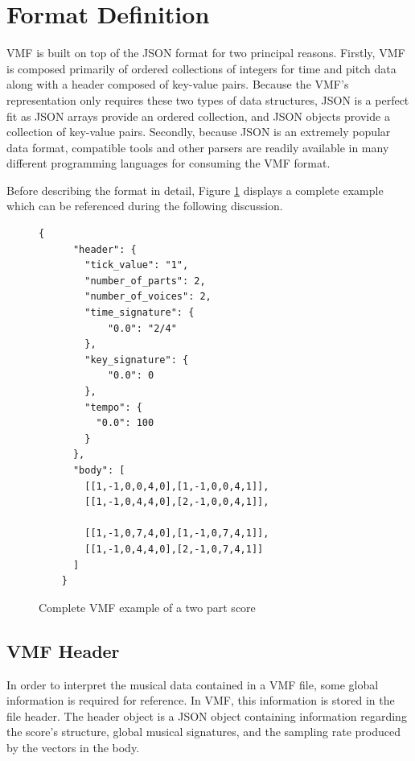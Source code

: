 
\section{Format Definition}

VMF is built on top of the JSON format for two principal reasons. Firstly, VMF is composed primarily of ordered collections of integers for time and pitch data along with a header composed of key-value pairs. Because the VMF's representation only requires these two types of data structures, JSON is a perfect fit as JSON arrays provide an ordered collection, and JSON objects provide a collection of key-value pairs. Secondly, because JSON is an extremely popular data format, compatible tools and other parsers are readily available in many different programming languages for consuming the VMF format.

Before describing the format in detail, Figure \ref{fig:completeExample} displays a complete example which can be referenced during the following discussion.

\begin{figure}
  \begin{center}
    \begin{Verbatim}[fontfamily=courier, xleftmargin=\parindent]
    {
      "header": {
        "tick_value": "1",
        "number_of_parts": 2,
        "number_of_voices": 2,
        "time_signature": {
            "0.0": "2/4"
        },
        "key_signature": {
            "0.0": 0
        },
        "tempo": {
          "0.0": 100
        }
      },
      "body": [
        [[1,-1,0,0,4,0],[1,-1,0,0,4,1]],
        [[1,-1,0,4,4,0],[2,-1,0,0,4,1]],

        [[1,-1,0,7,4,0],[1,-1,0,7,4,1]],
        [[1,-1,0,4,4,0],[2,-1,0,7,4,1]]
      ]
    }
    \end{Verbatim}
    \caption{Complete VMF example of a two part score}
    \label{fig:completeExample}
  \end{center}
\end{figure}

\subsection{VMF Header}

In order to interpret the musical data contained in a VMF file, some global information is required for reference. In VMF, this information is stored in the file header. The header object is a JSON object containing information regarding the score's structure, global musical signatures, and the sampling rate produced by the vectors in the body.

